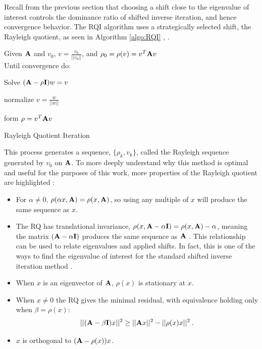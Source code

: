 Recall from the previous section that choosing a shift close to the eigenvalue of interest controls the dominance ratio of shifted inverse iteration, and hence convergence behavior. The RQI algorithm uses a strategically selected shift, the Rayleigh quotient, as seen in Algorithm \ref{algo:RQI} \cite{Trefethen1997}, \cite{Parlett1974}.
\begin{algorithm}
  Given $\mathbf{A}$ and $v_{0}$, $v = \frac{v_{0}}{||v_{0}||}$, and $\rho_{0} = \rho(v) = v^{T}\mathbf{A}v$ \\
  Until convergence do:
  \begin{list}{}{\hspace{2.5em}}
    \item Solve $(\mathbf{A} - \rho\mathbf{I})w = v$
    \item normalize $v = \frac{w}{||w||}$
    \item form $\rho = v^{T}\mathbf{A}v$
  \end{list}
  \caption{Rayleigh Quotient Iteration}
  \label{algo:RQI}
\end{algorithm}
%
This process generates a sequence, $\{\rho_{k}, v_{k}\}$, called the Rayleigh sequence generated by $v_{0}$ on $\mathbf{A}$. To more deeply understand why this method is optimal and useful for the purposes of this work, more properties of the Rayleigh quotient are highlighted \cite{Parlett1974}: 
%
\begin{itemize}
  \item For $\alpha \ne 0$, $\rho(\alpha x, \mathbf{A}) = \rho(x, \mathbf{A})$, so using any multiple of $x$ will produce the same sequence as $x$. 
  \item The RQ has translational invariance, $\rho(x, \mathbf{A} - \alpha \mathbf{I}) = \rho(x,\mathbf{A}) - \alpha$, meaning the matrix $(\mathbf{A} - \alpha \mathbf{I})$ produces the same sequence as $\mathbf{A}$ \cite{Parlett1974}. This relationship can be used to relate eigenvalues and applied shifts. In fact, this is one of the ways to find the eigenvalue of interest for the standard shifted inverse iteration method \cite{Sorensen1996}. 
\item When $x$ is an eigenvector of $\mathbf{A}$, $\rho(x)$ is stationary at $x$.  
\item When $x \ne 0$ the RQ gives the minimal residual, with equivalence holding only when $\beta = \rho(x)$:
%
\begin{equation}
  ||(\mathbf{A} - \beta\mathbf{I})x||^{2} \ge ||\mathbf{A}x||^{2} - ||\rho(x)x||^{2} \:.
\end{equation}
%
\item $x$ is orthogonal to $(\mathbf{A} - \rho(x))x$. 
\end{itemize}

